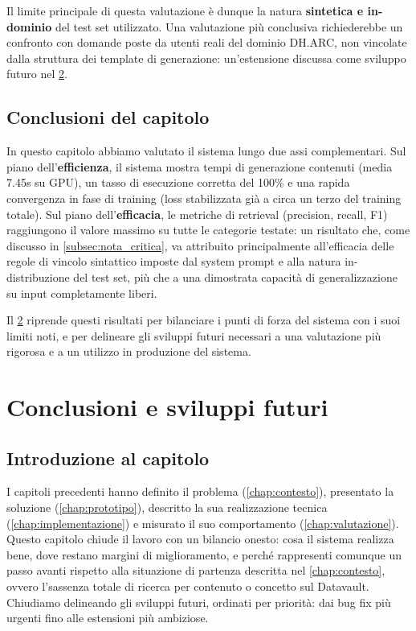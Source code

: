 \documentclass[12pt,a4paper,oneside]{book}
\begin{document}
Il limite principale di questa valutazione è dunque la natura \textbf{sintetica e in-dominio} del test set utilizzato. Una valutazione più conclusiva richiederebbe un confronto con domande poste da utenti reali del dominio DH.ARC, non vincolate dalla struttura dei template di generazione: un'estensione discussa come sviluppo futuro nel \cref{chap:conclusioni}.

\section{Conclusioni del capitolo}\label{sec:conclusioni_cap5}


In questo capitolo abbiamo valutato il sistema lungo due assi complementari. Sul piano dell'\textbf{efficienza}, il sistema mostra tempi di generazione contenuti (media 7.45s su GPU), un tasso di esecuzione corretta del 100\% e una rapida convergenza in fase di training (loss stabilizzata già a circa un terzo del training totale). Sul piano dell'\textbf{efficacia}, le metriche di retrieval (precision, recall, F1) raggiungono il valore massimo su tutte le categorie testate: un risultato che, come discusso in \cref{subsec:nota_critica}, va attribuito principalmente all'efficacia delle regole di vincolo sintattico imposte dal system prompt e alla natura in-distribuzione del test set, più che a una dimostrata capacità di generalizzazione su input completamente liberi.

Il \cref{chap:conclusioni} riprende questi risultati per bilanciare i punti di forza del sistema con i suoi limiti noti, e per delineare gli sviluppi futuri necessari a una valutazione più rigorosa e a un utilizzo in produzione del sistema. 
\chapter{Conclusioni e sviluppi futuri}\label{chap:conclusioni}

\section{Introduzione al capitolo}\label{sec:intro_cap6}


I capitoli precedenti hanno definito il problema (\cref{chap:contesto}), presentato la soluzione (\cref{chap:prototipo}), descritto la sua realizzazione tecnica (\cref{chap:implementazione}) e misurato il suo comportamento (\cref{chap:valutazione}). Questo capitolo chiude il lavoro con un bilancio onesto: cosa il sistema realizza bene, dove restano margini di miglioramento, e perché rappresenti comunque un passo avanti rispetto alla situazione di partenza descritta nel \cref{chap:contesto}, ovvero l'sassenza totale di ricerca per contenuto o concetto sul Datavault.
Chiudiamo delineando gli sviluppi futuri, ordinati per priorità: dai bug fix più urgenti fino alle estensioni più ambiziose.
\end{document}

